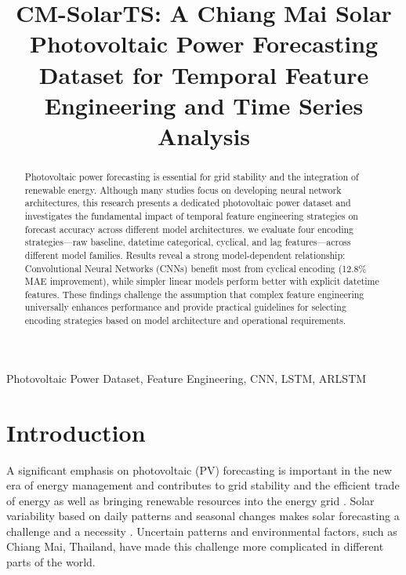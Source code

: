 \documentclass[conference]{IEEEtran}
\begin{document}
\title{CM-SolarTS: A Chiang Mai Solar Photovoltaic Power Forecasting Dataset for Temporal Feature Engineering and Time Series Analysis \\
}

\author{



\and
{}
}

\maketitle

\begin{abstract}
Photovoltaic power forecasting is essential for grid stability and the integration of renewable energy. Although many studies focus on developing neural network architectures, this research presents a dedicated photovoltaic power dataset and investigates the fundamental impact of temporal feature engineering strategies on forecast accuracy across different model architectures. we evaluate four encoding strategies—raw baseline, datetime categorical, cyclical, and lag features—across different model families. Results reveal a strong model-dependent relationship: Convolutional Neural Networks (CNNs) benefit most from cyclical encoding (12.8\% MAE improvement), while simpler linear models perform better with explicit datetime features. These findings challenge the assumption that complex feature engineering universally enhances performance and provide practical guidelines for selecting encoding strategies based on model architecture and operational requirements.
\end{abstract}

\begin{IEEEkeywords}
Photovoltaic Power Dataset, Feature Engineering, CNN, LSTM, ARLSTM
\end{IEEEkeywords}

\section{Introduction}
A significant emphasis on photovoltaic (PV) forecasting is important in the new era of energy management and contributes to grid stability and the efficient trade of energy as well as bringing renewable resources into the energy grid \cite{Ahmed2020}. Solar variability based on daily patterns and seasonal changes makes solar forecasting a challenge and a necessity \cite{Antonanzas2016}. Uncertain patterns and environmental factors, such as Chiang Mai, Thailand, have made this challenge more complicated in different parts of the world.
\end{document}
